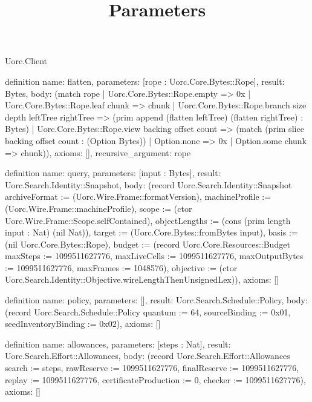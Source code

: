 \begin{lexlean}{Uorc.Client}
\title{Parameters}
\begin{semanticmodule}
definition{
  name: flatten,
  parameters: [rope : Uorc.Core.Bytes::Rope],
  result: Bytes,
  body: (match rope
    | Uorc.Core.Bytes::Rope.empty => 0x
    | Uorc.Core.Bytes::Rope.leaf chunk => chunk
    | Uorc.Core.Bytes::Rope.branch size depth leftTree rightTree => (prim append (flatten leftTree) (flatten rightTree) : Bytes)
    | Uorc.Core.Bytes::Rope.view backing offset count => (match (prim slice backing offset count : (Option Bytes))
      | Option.none => 0x
      | Option.some chunk => chunk)),
  axioms: [],
  recursive_argument: rope
}

definition{
  name: query,
  parameters: [input : Bytes],
  result: Uorc.Search.Identity::Snapshot,
  body: (record Uorc.Search.Identity::Snapshot {archiveFormat := (Uorc.Wire.Frame::formatVersion), machineProfile := (Uorc.Wire.Frame::machineProfile), scope := (ctor Uorc.Wire.Frame::Scope.selfContained), objectLengths := (cons (prim length input : Nat) (nil Nat)), target := (Uorc.Core.Bytes::fromBytes input), basis := (nil Uorc.Core.Bytes::Rope), budget := (record Uorc.Core.Resources::Budget {maxSteps := 1099511627776, maxLiveCells := 1099511627776, maxOutputBytes := 1099511627776, maxFrames := 1048576}), objective := (ctor Uorc.Search.Identity::Objective.wireLengthThenUnsignedLex)}),
  axioms: []
}

definition{
  name: policy,
  parameters: [],
  result: Uorc.Search.Schedule::Policy,
  body: (record Uorc.Search.Schedule::Policy {quantum := 64, sourceBinding := 0x01, seedInventoryBinding := 0x02}),
  axioms: []
}

definition{
  name: allowances,
  parameters: [steps : Nat],
  result: Uorc.Search.Effort::Allowances,
  body: (record Uorc.Search.Effort::Allowances {search := steps, rawReserve := 1099511627776, finalReserve := 1099511627776, replay := 1099511627776, certificateProduction := 0, checker := 1099511627776}),
  axioms: []
}


\end{semanticmodule}
\end{lexlean}
